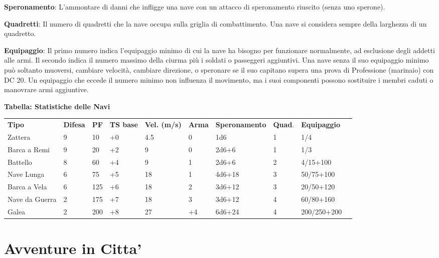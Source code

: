 \documentclass[a4paper,11pt,twoside,openany]{book}
\begin{document}
\textbf{Speronamento}: L'ammontare di danni che infligge una nave con un attacco di speronamento riuscito (senza uno sperone).

\textbf{Quadretti}: Il numero di quadretti che la nave occupa sulla griglia di combattimento. Una nave si considera sempre della larghezza di un quadretto.

\textbf{Equipaggio}: Il primo numero indica l'equipaggio minimo di cui la nave ha bisogno per funzionare normalmente, ad esclusione degli addetti alle armi. Il secondo indica il numero massimo della ciurma più i soldati o passeggeri aggiuntivi. Una nave senza il suo equipaggio minimo può soltanto muoversi, cambiare velocità, cambiare direzione, o speronare se il suo capitano supera una prova di Professione (marinaio) con DC 20.
Un equipaggio che eccede il numero minimo non influenza il movimento, ma i suoi componenti possono sostituire i membri caduti o manovrare armi aggiuntive.

\bigskip

\textbf{Tabella: Statistiche delle Navi}

\medskip

\begin{tabularx}{0.95\textwidth}{lXlllllXll}
	\toprule
	\textbf{Tipo}  & \textbf{Difesa} & \textbf{PF} & \textbf{TS base} & \textbf{Vel. (m/s)} & \textbf{Arma} & \textbf{Speronamento} & \textbf{Quad}. & \textbf{Equipaggio}\\
	Zattera   & 9     & 10& +0& 4.5  & 0   & 1d6    & 1    & 1/4\\
	Barca a Remi   & 9& 20& +2& 9    & 0   & 2d6+6  & 1    & 1/3\\
	Battello  & 8& 60& +4& 9    & 1   & 2d6+6  & 2    & 4/15+100\\
	Nave Lunga& 6& 75& +5& 18   & 1   & 4d6+18 & 3    & 50/75+100\\
	Barca a Vela   & 6& 125    & +6& 18   & 2   & 3d6+12 & 3    & 20/50+120\\
	Nave da Guerra & 2& 175    & +7& 18   & 3   & 3d6+12 & 4    & 60/80+160\\
	Galea& 2& 200    & +8& 27   & +4  & 6d6+24 & 4    & 200/250+200\\
\end{tabularx}

\pagebreak

\section{Avventure in Citta'}
\end{document}
